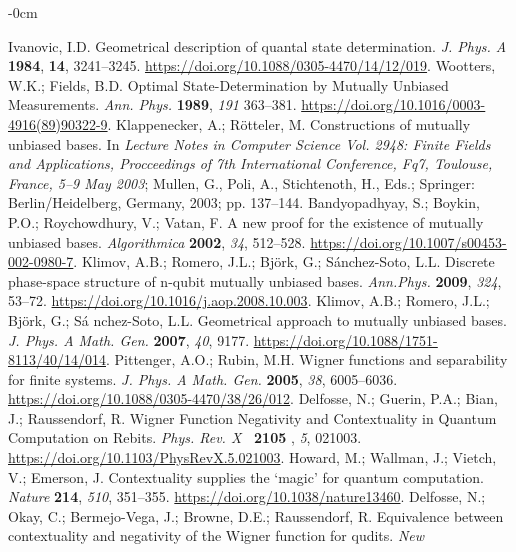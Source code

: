 \documentclass[quantumrep,article,accept,pdftex,moreauthors]{Definitions/mdpi}
\begin{document}
\begin{adjustwidth}{-\extralength}{0cm}
\begin{thebibliography}{999}
 Ivanovic, I.D. Geometrical description of quantal state
determination. \textit{J. Phys. A} \textbf{1984}, \textbf{14}, 3241--3245.
\url{https://doi.org/10.1088/0305-4470/14/12/019}.
 Wootters, W.K.; Fields, B.D. Optimal State-Determination
by Mutually Unbiased Measurements. \textit{Ann. Phys.} \textbf{1989}, 
\textit{191} 363--381. \url{https://doi.org/10.1016/0003-4916(89)90322-9}.
 Klappenecker, A.; R{\"{o}}tteler, M. Constructions of
mutually unbiased bases. In \textit{Lecture Notes in Computer Science Vol.
2948: Finite Fields and Applications, Procceedings of 7th International
Conference, Fq7, Toulouse, France, 5--9 May 2003}; Mullen, G., Poli, A., Stichtenoth, H., Eds.; Springer: Berlin/Heidelberg, Germany, 2003; pp. 137--144.
 Bandyopadhyay, S.; Boykin, P.O.; Roychowdhury,
V.; Vatan, F. A new proof for the existence of mutually unbiased bases. 
\textit{Algorithmica} \textbf{2002}, \textit{34}, 512--528.
\url{https://doi.org/10.1007/s00453-002-0980-7}.
 Klimov, A.B.; Romero, J.L.; Bj\"{o}rk, G.; S\'{a}nchez-Soto,
L.L. Discrete phase-space structure of n-qubit mutually unbiased bases. 
\textit{Ann.Phys.} \textbf{2009}, \textit{324}, 53--72.
\url{https://doi.org/10.1016/j.aop.2008.10.003}.
 Klimov, A.B.; Romero, J.L.; Bj{\"{o}}rk, G.; S{\'{a}}%
nchez-Soto, L.L. Geometrical approach to mutually unbiased bases. \textit{%
J. Phys. A Math. Gen.} \textbf{2007}, \textit{40}, 9177.
\url{https://doi.org/10.1088/1751-8113/40/14/014}.
 Pittenger, A.O.; Rubin, M.H. Wigner functions and
separability for finite systems. \textit{J. Phys. A Math. Gen.} \textbf{2005}, \textit{38}, 6005--6036. \url{https://doi.org/10.1088/0305-4470/38/26/012}.
 Delfosse, N.; Guerin, P.A.; Bian, J.; Raussendorf, R. Wigner
Function Negativity and Contextuality in Quantum Computation on Rebits. 
\textit{Phys. Rev. X} \textbf{\ 2105 }, \textit{5}, 021003.
\url{https://doi.org/10.1103/PhysRevX.5.021003}.
 Howard, M.; Wallman, J.; Vietch, V.; Emerson, J.
Contextuality supplies the `magic' for quantum computation. \textit{Nature}
\textbf{214}, \textit{510}, 351--355. \url{https://doi.org/10.1038/nature13460}.
 Delfosse, N.; Okay, C.; Bermejo-Vega, J.; Browne, D.E.; Raussendorf, R.
Equivalence between
contextuality and negativity of the Wigner function for qudits. \textit{New
}
\end{thebibliography}
\end{adjustwidth}
\end{document}
